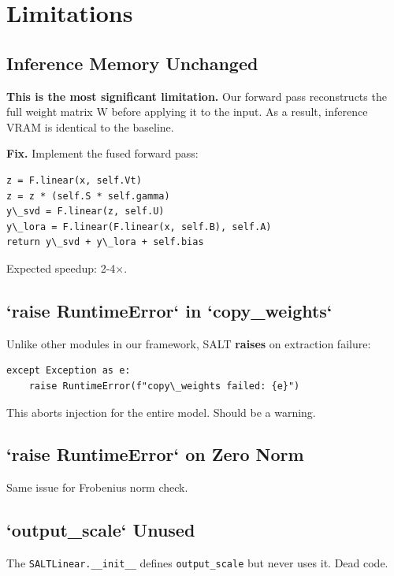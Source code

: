 
\section{Limitations}

\subsection{Inference Memory Unchanged}

\textbf{This is the most significant limitation.} Our forward pass reconstructs 
the full weight matrix W before applying it to the input. As a result, 
inference VRAM is identical to the baseline.

\textbf{Fix.} Implement the fused forward pass:

\begin{lstlisting}
z = F.linear(x, self.Vt)
z = z * (self.S * self.gamma)
y\_svd = F.linear(z, self.U)
y\_lora = F.linear(F.linear(x, self.B), self.A)
return y\_svd + y\_lora + self.bias
\end{lstlisting}

Expected speedup: 2-4$\times$.

\subsection{`raise RuntimeError` in `copy\_weights`}

Unlike other modules in our framework, SALT \textbf{raises} on extraction failure:

\begin{lstlisting}
except Exception as e:
    raise RuntimeError(f"copy\_weights failed: {e}")
\end{lstlisting}

This aborts injection for the entire model. Should be a warning.

\subsection{`raise RuntimeError` on Zero Norm}

Same issue for Frobenius norm check.

\subsection{`output\_scale` Unused}

The \texttt{SALTLinear.\_\_init\_\_} defines \texttt{output\_scale} but never uses it. Dead code.

